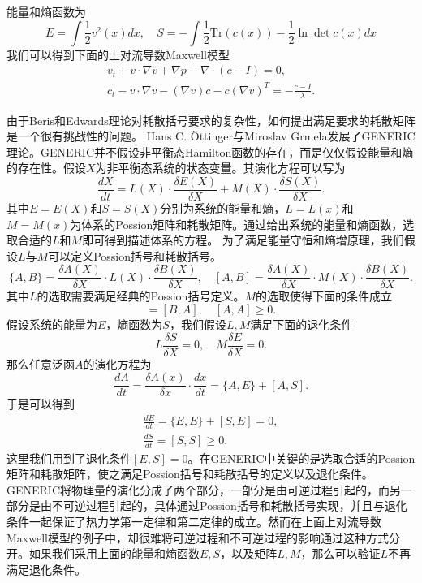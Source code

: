 能量和熵函数为
\begin{equation*}
	E = \int \frac{1}{2} v^2(x)dx, \quad S = -\int \frac{1}{2} \mbox{
 	Tr}(c(x))- \frac{1}{2}  \ln \det c(x) dx
\end{equation*}
我们可以得到下面的上对流导数Maxwell模型
\begin{subequations}\label{eq:chap1UCMmaxll}
\begin{align}
	v_t + v \cdot \nabla v + \nabla p  - \nabla \cdot (c - I) = 0, \\
	c_t - v \cdot \nabla v - (\nabla v)c - c (\nabla v)^T = -\frac{c-I}{\lambda}.
\end{align}
\end{subequations}

由于Beris和Edwards理论对耗散括号要求的复杂性，如何提出满足要求的耗散矩阵是一个很有挑战性的问题。
 Hans C. \"Ottinger与Miroslav Grmela发展了GENERIC理论\cite{ottinger2005beyond}。GENERIC并不假设非平衡态Hamilton函数的存在，而是仅仅假设能量和熵的存在性。假设$X$为非平衡态系统的状态变量。其演化方程可以写为
\begin{equation*}
	\frac{dX}{dt} = L(X) \cdot \frac{\delta E(X)}{\delta X} + M(X) \cdot \frac{\delta S(X)}{\delta X} .
\end{equation*}
其中$E=E(X)$和$S=S(X)$分别为系统的能量和熵，$L=L(x)$和$M=M(x)$为体系的Possion矩阵和耗散矩阵。通过给出系统的能量和熵函数，选取合适的$L$和$M$即可得到描述体系的方程。 为了满足能量守恒和熵增原理，我们假设$L$与$M$可以定义Possion括号和耗散括号。
\begin{equation*}
	\{ A,B \} = \frac{\delta A(X)}{\delta X} \cdot L(X) \cdot \frac{\delta B(X)}{\delta X}, \quad  [ A,B ] = \frac{\delta A(X)}{\delta X} \cdot M(X) \cdot \frac{\delta B(X)}{\delta X}. 
\end{equation*}
其中$L$的选取需要满足经典的Possion括号定义。$M$的选取使得下面的条件成立
\begin{equation*}
	[A,B] = [B,A], \quad [A,A] \ge 0.
\end{equation*}
假设系统的能量为$E$，熵函数为$S$，我们假设$L,M$满足下面的退化条件
\begin{equation}
	L \frac{\delta S}{\delta X} = 0, \quad M \frac{\delta E}{\delta X} = 0.
\end{equation}
那么任意泛函$A$的演化方程为
 \begin{equation*}
	\frac{d A}{dt} = \frac{\delta A(x)}{\delta x} \cdot \frac{dx}{dt} = \{ A,E\} + [A,S].
\end{equation*}
于是可以得到
\begin{eqnarray*}
	\frac{d E}{dt} = \{E,E\} +[S,E] = 0, \\
	\frac{d S}{dt} = [S,S] \ge 0. 
\end{eqnarray*}
这里我们用到了退化条件$[E,S] = 0$。在GENERIC中关键的是选取合适的Possion矩阵和耗散矩阵，使之满足Possion括号和耗散括号的定义以及退化条件。GENERIC将物理量的演化分成了两个部分，一部分是由可逆过程引起的，而另一部分是由不可逆过程引起的，具体通过Possion括号和耗散括号实现，并且与退化条件一起保证了热力学第一定律和第二定律的成立。然而在上面上对流导数Maxwell模型的例子中，却很难将可逆过程和不可逆过程的影响通过这种方式分开。如果我们采用上面的能量和熵函数$E,S$，以及矩阵$L,M$，那么可以验证$L$不再满足退化条件。  

